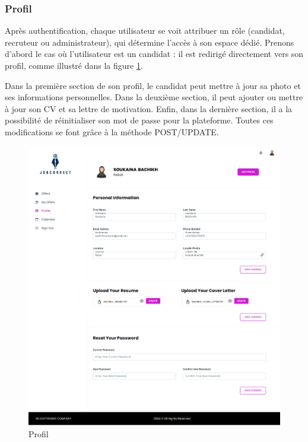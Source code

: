 \subsubsection{Profil}
Après authentification, chaque utilisateur se voit attribuer 
un  rôle (candidat, recruteur ou administrateur),  qui  
détermine  l'accès  à son  espace dédié. Prenons d'abord le cas 
où l'utilisateur est un candidat : il est redirigé directement 
vers son profil, comme illustré dans la figure \ref{fig:profile}.
\newline

Dans la première section de son profil, le  candidat peut mettre 
à jour sa photo et ses informations personnelles. Dans la 
deuxième section, il  peut ajouter ou mettre à jour son CV et 
sa lettre  de  motivation.  Enfin,  dans  la  dernière section, 
il a la possibilité de réinitialiser son mot de passe pour la 
plateforme. Toutes ces modifications se font grâce à la méthode 
POST/UPDATE.
\newline


\begin{figure}[htbp]
   \centering
   \includegraphics[scale=0.3]{screens/profile.png} 
   \caption{Profil}
   \label{fig:profile}
\end{figure}

